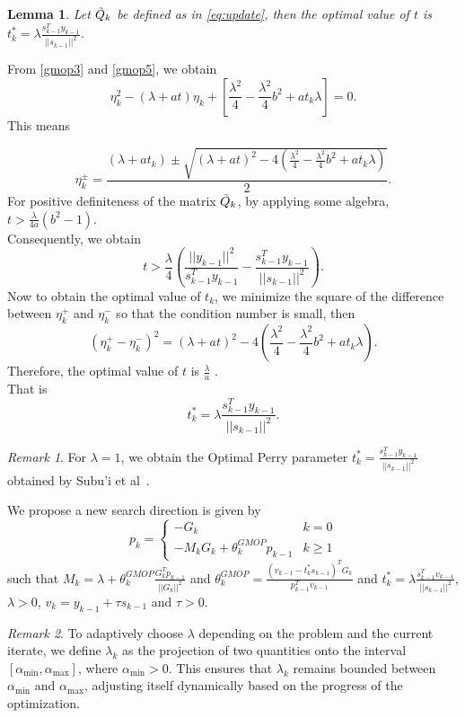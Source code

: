 \documentclass{article}
\newtheorem{lemma}{Lemma}
\theoremstyle{remark}
\newtheorem{remark}{Remark}
\begin{document}
{\begin{lemma}
\label{lemma:optimalt}    
Let $\Tilde{Q}_k$ be defined as in \eqref{eq:update}, then the optimal value of $t$ is $t_k^*=\lambda\frac{s_{k-1}^Ty_{k-1}}{||s_{k-1}||^2}$.
\end{lemma}

 
 From \eqref{gmop3} and \eqref{gmop5}, we obtain
 \begin{equation}
     \eta_k^2-(\lambda+at)\eta_k+\left[\frac{\lambda^2}{4}-\frac{\lambda^2}{4}b^2+at_k\lambda\right]=0.
 \end{equation}
 This means
 
 \begin{equation}
     \eta_k^{\pm}=\frac{(\lambda+at_k)\pm\sqrt{(\lambda+at)^2 - 4(\frac{\lambda^2}{4}-\frac{\lambda^2}{4}b^2+at_k\lambda)}}{2}.
 \end{equation}
 For positive definiteness of the matrix $\Tilde{Q}_k$, by applying some algebra, $t>\frac{\lambda}{4a}(b^2-1)$.\\
 Consequently, we obtain 
 \[
 t>\frac{\lambda}{4}(\frac{||y_{k-1}||^2}{s_{k-1}^Ty_{k-1}}-\frac{s_{k-1}^Ty_{k-1}}{||s_{k-1}||^2}).
 \]
 Now to obtain the optimal value of $t_k$, we minimize the square of the difference between $\eta_k^+$ and $\eta_k^-$ so that the condition number is small, then 
 \begin{equation}
   (\eta_k^+-\eta_k^-)^2 =(\lambda+at)^2 - 4(\frac{\lambda^2}{4}-\frac{\lambda^2}{4}b^2+at_k\lambda).
 \end{equation}
Therefore, the optimal value of $t$ is $\frac{\lambda }{a}$ .\\
That is 
\[
t_k^*=\lambda\frac{s_{k-1}^Ty_{k-1}}{||s_{k-1}||^2}.
\]
\begin{remark}
For $\lambda=1$, we obtain the Optimal Perry parameter $t_k^*=\frac{s_{k-1}^Ty_{k-1}}{||s_{k-1}||^2}$ obtained by Subu'i et al~\cite{sabi2023modified}.
\end{remark}

 We propose a new search direction is given by 
\begin{equation}
p_k=\begin{cases}\label{GMOP}
    -G_k & k=0\\
    -M_kG_k+\theta_k^{GMOP}p_{k-1} & k\geq 1
\end{cases}
\end{equation}
such that $M_k=\lambda +\theta_k^{GMOP}\frac{G_k^Tp_{k-1}}{||G_k||^2}$ and $\theta_k^{GMOP}=\frac{(v_{k-1}-t_k^*s_{k-1})^TG_k}{p_{k-1}^Tv_{k-1}}$ and $t_k^*=\lambda \frac{s_{k-1}^Tv_{k-1}}{||s_{k-1}||^2}$, $\lambda > 0$, $v_k=y_{k-1}+\tau s_{k-1}$ and $\tau>0$. 
\begin{remark}
    \label{rem:adaptive}
    To adaptively choose $\lambda$ depending on the problem and the current iterate, we define $\lambda_k$ as the projection of two quantities onto the interval $[\alpha_{\min}, \alpha_{\max}]$, where $\alpha_{\min} > 0$. This ensures that $\lambda_k$ remains bounded between $\alpha_{\min}$ and $\alpha_{\max}$, adjusting itself dynamically based on the progress of the optimization.


\end{remark}}
\end{document}
